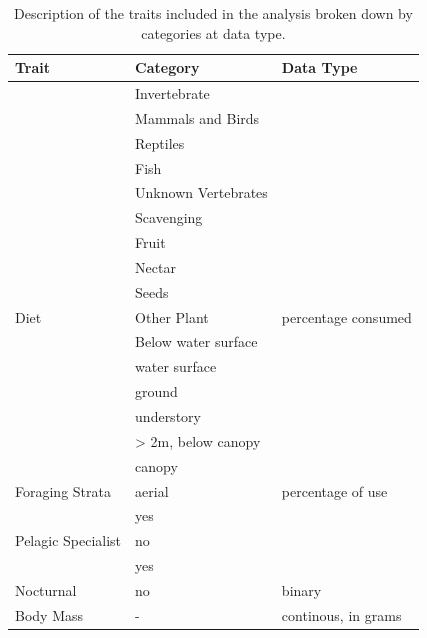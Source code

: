 \documentclass{article}
\begin{document}
\begin{table}

\caption{\label{tab:traitTable}Description of the traits included in the analysis broken down by categories at data type.}
\centering
\begin{tabular}[t]{l|l|l}
\hline
Trait & Category & Data Type\\
\hline
 & Invertebrate & \\
\cline{2-2}
 & Mammals and Birds & \\
\cline{2-2}
 & Reptiles & \\
\cline{2-2}
 & Fish & \\
\cline{2-2}
 & Unknown Vertebrates & \\
\cline{2-2}
 & Scavenging & \\
\cline{2-2}
 & Fruit & \\
\cline{2-2}
 & Nectar & \\
\cline{2-2}
 & Seeds & \\
\cline{2-2}
\multirow{-10}{*}{\raggedright\arraybackslash Diet} & Other Plant & \multirow{-10}{*}{\raggedright\arraybackslash percentage consumed}\\
\cline{1-3}
 & Below water surface & \\
\cline{2-2}
 & water surface & \\
\cline{2-2}
 & ground & \\
\cline{2-2}
 & understory & \\
\cline{2-2}
 & > 2m, below canopy & \\
\cline{2-2}
 & canopy & \\
\cline{2-2}
\multirow{-7}{*}{\raggedright\arraybackslash Foraging Strata} & aerial & \multirow{-7}{*}{\raggedright\arraybackslash percentage of use}\\
\cline{1-3}
 & yes & \\
\cline{2-2}
\multirow{-2}{*}{\raggedright\arraybackslash Pelagic Specialist} & no & \\
\cline{1-2}
 & yes & \\
\cline{2-2}
\multirow{-2}{*}{\raggedright\arraybackslash Nocturnal} & no & \multirow{-4}{*}{\raggedright\arraybackslash binary}\\
\cline{1-3}
Body Mass & - & continous, in grams\\
\hline
\end{tabular}
\end{table}
\end{document}
